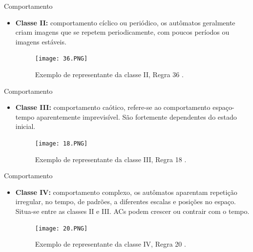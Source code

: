 \documentclass[compress, hide notes]{beamer}
\begin{document}
\begin{frame}{Comportamento \cite{ufmg}}
	
	\begin{itemize}
		
		\item \textbf{Classe II:} comportamento cíclico ou periódico, os autômatos geralmente criam imagens que se repetem periodicamente, com poucos períodos ou imagens estáveis.
	
		\begin{figure}[h]
											
			\center
																
			\texttt{[image: 36.PNG]}
			\caption{Exemplo de representante da classe II, Regra 36 \cite{ufmg}.}
												
		\end{figure}
		
	\end{itemize}
	
\end{frame}

\begin{frame}{Comportamento \cite{ufmg}}
	
	\begin{itemize}
		
		\item \textbf{Classe III:} comportamento caótico, refere-se ao comportamento espaço-tempo aparentemente imprevisível. São fortemente dependentes do estado inicial.
	
		\begin{figure}[h]
											
			\center
																
			\texttt{[image: 18.PNG]}
			\caption{Exemplo de representante da classe III, Regra 18 \cite{ufmg}.}
												
		\end{figure}
		
	\end{itemize}
	
\end{frame}

\begin{frame}{Comportamento \cite{ufmg}}
	
	\begin{itemize}
		
		\item \textbf{Classe IV:} comportamento complexo, os autômatos aparentam repetição irregular, no tempo, de padrões, a diferentes escalas e posições no espaço. Situa-se entre as classes II e III. ACs podem crescer ou contrair com o tempo.
	
		\begin{figure}[h]
											
			\center
																
			\texttt{[image: 20.PNG]}
			\caption{Exemplo de representante da classe IV, Regra 20 \cite{ufmg}.}
												
		\end{figure}
		
	\end{itemize}
	
\end{frame}
\end{document}
